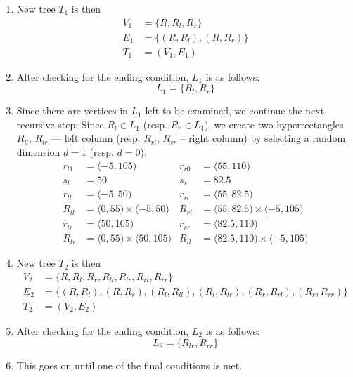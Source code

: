 \begin{example}
\begin{enumerate}
    \item New tree $T_1$ is then
    \begin{align*}
    V_1 &= \{R, R_l, R_r\} \\
    E_1 &= \{(R, R_l), (R, R_r)\} \\
    T_1 &= (V_1, E_1)
    \end{align*}

    \item After checking for the ending condition, $L_1$ is as follows:
    $$L_1 = \{R_l, R_r\}$$

    \item Since there are vertices in $L_1$ left to be examined, we continue the next recursive step:
    Since $R_l \in L_1$ (resp. $R_r \in L_1$), we create two hyperrectangles $R_{ll}$, $R_{lr}$ --- left column (resp. $R_{rl}$, $R_{rr}$ -- right column) by selecting a random dimension $d=1$ (resp. $d=0$).
    \begin{align*}
        r_{l1} &= \langle -5, 105)& r_{r0} &= \langle 55, 110) \\
        s_l &= 50 & s_r&=82.5\\
        r_{ll} &= \langle -5, 50) & r_{rl} &= \langle 55, 82.5) \\
        R_{ll} &= \langle 0, 55) \times \langle -5,50) & R_{rl} &= \langle 55, 82.5) \times \langle -5,105)\\
        r_{lr} &= \langle 50, 105) & r_{rr} &= \langle 82.5, 110) \\
        R_{lr} &= \langle 0, 55) \times \langle 50,105) & R_{ll} &= \langle 82.5, 110) \times \langle -5,105)
    \end{align*}

    \item New tree $T_2$ is then
    \begin{align*}
        V_2 &= \{R, R_l, R_r, R_{ll}, R_{lr}, R_{rl}, R_{rr}\} \\
        E_2 &= \{(R, R_l), (R, R_r), (R_l, R_{ll}), (R_l, R_{lr}), (R_r, R_{rl}), (R_r, R_{rr})\} \\
        T_2 &= (V_2, E_2)
    \end{align*}

    \item After checking for the ending condition, $L_2$ is as follows:
    $$L_2 = \{R_{lr}, R_{rr}\}$$

    \item This goes on until one of the final conditions is met.

\end{enumerate}

\end{example}


